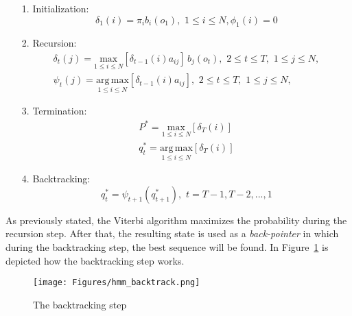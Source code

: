 \begin{itemize}
	\item[1.]{Initialization:} \\
	\begin{equation}
		\delta_{1}(i) = \pi_{i}b_{i}(o_{1}), \,\, 1 \leq i \leq N, \phi_{1}(i) = 0
	\end{equation}

	\item[2.]{Recursion:} \\
	\begin{subequations}
		\begin{align}
		\delta_{t}(j) = \underset{1\leq i \leq N}{\mathrm{max}} [\delta_{t-1}(i)a_{ij}] \, b_{j}(o_{t}), \,\, 2 \leq t \leq T, \,\, 1 \leq j \leq N, \\
		\psi_{t}(j) = \underset{1\leq i \leq N}{\mathrm{arg \, max}} [\delta_{t-1}(i)a_{ij}], \,\, 2 \leq t \leq T, \,\, 1 \leq j \leq N,
		\end{align}
	\end{subequations}

	\item[3.]{Termination:} \\
	\begin{subequations}
		\begin{align}
		P^{*} = \underset{1\leq i \leq N}{\mathrm{max}}[\delta_{T}(i)] \\
		q_{t}^{*} = \underset{1\leq i \leq N}{\mathrm{arg \, max}}[\delta_{T}(i)]
		\end{align}
	\end{subequations}

	\item[4.]{Backtracking:} \\
	\begin{equation}
		q_{t}^{*} = \psi_{t+1}(q_{t+1}^{*}), \,\, t = T - 1, T - 2, ... , 1
	\end{equation}
\end{itemize}

\noindent As previously stated, the Viterbi algorithm maximizes the probability during the recursion step. After that, the resulting state is used as a \textit{back-pointer} in which during the backtracking step, the best sequence will be found. In Figure~\ref{fig:hmm_backtrack} is depicted how the backtracking step works.

\begin{figure}[!ht]
	\centering
	\texttt{[image: Figures/hmm\_backtrack.png]}
	\caption{The backtracking step \cite{hmm_tutorial}}
	\label{fig:hmm_backtrack}
\end{figure}


